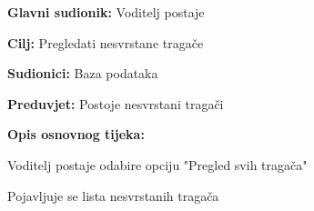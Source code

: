 					\noindent {}
					\begin{packed_item}
	
						\item \textbf{Glavni sudionik: }  Voditelj postaje
						\item  \textbf{Cilj:} Pregledati nesvrstane tragače
						\item  \textbf{Sudionici:} Baza podataka
						\item  \textbf{Preduvjet:} Postoje nesvrstani tragači
						\item  \textbf{Opis osnovnog tijeka:} 
						
						
						\item[] \begin{packed_enum}
	
							\item Voditelj postaje odabire opciju "Pregled svih tragača"						
							\item Pojavljuje se lista nesvrstanih tragača
							
						\end{packed_enum}
					\end{packed_item}
					\noindent {}
